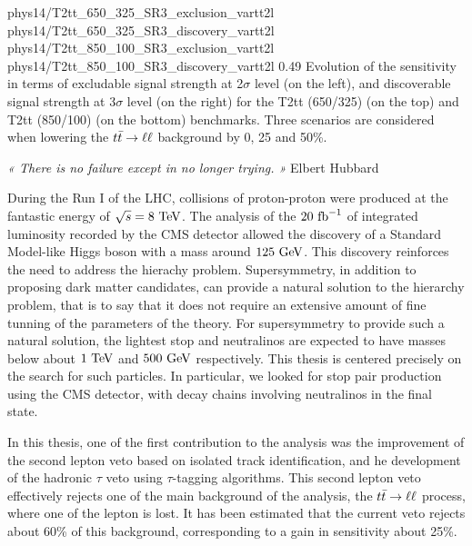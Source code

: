                          {phys14/T2tt_650_325_SR3_exclusion_vartt2l}
                         {phys14/T2tt_650_325_SR3_discovery_vartt2l}
                         {phys14/T2tt_850_100_SR3_exclusion_vartt2l}
                         {phys14/T2tt_850_100_SR3_discovery_vartt2l}
                         {0.49}
                         {Evolution of the sensitivity in terms of excludable signal strength
                         at 2$\sigma$ level (on the left), and discoverable signal strength
                         at 3$\sigma$ level (on the right) for the T2tt (650/325) (on the top)
                         and T2tt (850/100) (on the bottom) benchmarks. Three scenarios are
                         considered when lowering the $t\bar{t} \rightarrow \ell \ell$ background by 0, 25 and 50\%.}

\hspace*{0.37\textwidth}
\begin{minipage}{0.62\textwidth}
\emph{« There is no failure except in no longer trying. »}
\hspace*{0.6\textwidth} Elbert Hubbard
\end{minipage}

\vspace*{0.5cm}

During the Run I of the LHC, collisions of proton-proton were produced at the fantastic
energy of $\sqrt{s} = 8~\text{TeV}$. The analysis of the $20~\text{fb}^{-1}$ of integrated luminosity
recorded by the CMS detector allowed the discovery of a Standard Model-like Higgs boson
with a mass around $125~\text{GeV}$. This discovery reinforces the need to address the hierachy
problem. Supersymmetry, in addition to proposing dark matter candidates, can provide a natural
solution to the hierarchy problem, that is to say that it does not require an extensive amount of fine
tunning of the parameters of the theory. For supersymmetry to provide such a natural solution,
the lightest stop and neutralinos are expected to have masses below about $1~\text{TeV}$ and $500~\text{GeV}$
respectively. This thesis is centered precisely on the search for such particles. In particular,
we looked for stop pair production using the CMS detector, with decay chains involving
neutralinos in the final state.

In this thesis, one of the first contribution to the analysis was the improvement of the
second lepton veto based on isolated track identification, and he development of the
hadronic $\tau$ veto using $\tau$-tagging algorithms. This second lepton veto effectively
rejects one  of the main background of the analysis, the $t\bar{t} \rightarrow \ell \ell$ process, where one
of the lepton is lost. It has been estimated that the current veto rejects about 60\% of
this background, corresponding to a gain in sensitivity about 25\%.


